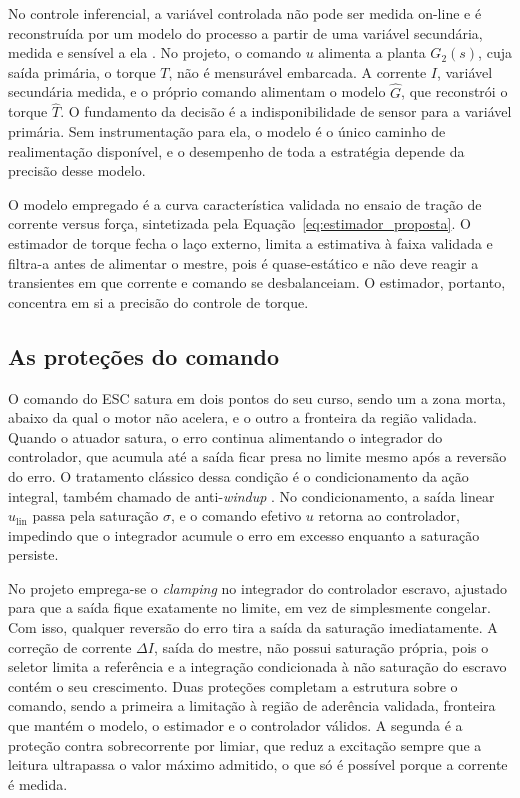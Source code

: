 No controle inferencial, a variável controlada não pode ser medida on-line e é
reconstruída por um modelo do processo a partir de uma variável secundária, medida e
sensível a ela \cite{raffo_tcpi_cascata}. No projeto, o comando $u$ alimenta a planta $G_2(s)$, cuja saída primária, o
torque $T$, não é mensurável embarcada. A corrente $I$, variável secundária medida, e o
próprio comando alimentam o modelo $\hat{G}$, que reconstrói o torque $\hat{T}$. O
fundamento da decisão é a indisponibilidade de sensor para a variável primária. Sem
instrumentação para ela, o modelo é o único caminho de realimentação disponível, e o
desempenho de toda a estratégia depende da precisão desse modelo.

O modelo empregado é a curva característica validada no ensaio de tração de
corrente versus força,
sintetizada pela
Equação~\eqref{eq:estimador_proposta}. O estimador de torque fecha o laço externo,
limita a estimativa à faixa validada e
filtra-a antes de alimentar o mestre, pois é quase-estático e não deve reagir a
transientes em que corrente e comando se desbalanceiam. O estimador, portanto,
concentra em si a precisão do controle de torque.

\subsection{As proteções do comando}
\label{sec:protecoes}

O comando do ESC satura em dois pontos do seu curso, sendo um a zona morta, abaixo da qual o
motor não acelera, e o outro a fronteira da região validada. Quando o atuador satura, o erro
continua alimentando o integrador do controlador, que acumula até a saída ficar presa
no limite mesmo após a reversão do erro. O tratamento clássico dessa condição é o
condicionamento da ação integral, também chamado de anti-\emph{windup}
\cite{raffo_tcpi_pid2}. No condicionamento,
a saída linear $u_{\mathrm{lin}}$ passa pela saturação $\sigma$, e
o comando efetivo $u$ retorna ao controlador, impedindo que o
integrador acumule o
erro em excesso enquanto a saturação persiste.

No projeto emprega-se o \emph{clamping} no integrador do controlador escravo, ajustado
para que a saída fique exatamente no limite, em vez de simplesmente congelar. Com isso, qualquer reversão do erro tira a saída da saturação imediatamente. A correção de corrente $\Delta I$, saída do mestre, não possui saturação própria, pois o seletor limita a referência e a integração condicionada à não saturação do escravo contém o seu crescimento. Duas
proteções completam a estrutura sobre o comando, sendo a primeira a limitação à região de aderência
validada, fronteira que mantém o modelo, o estimador e o controlador válidos.
A segunda é a proteção contra sobrecorrente por limiar, que reduz a excitação sempre que a
leitura ultrapassa o valor máximo admitido, o que só é possível porque a corrente é medida.


